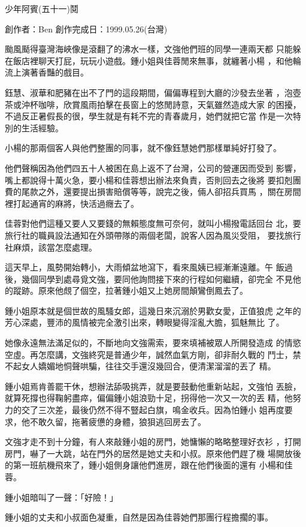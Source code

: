 



少年阿賓(五十一)鬩

創作者：Ben
創作完成日：1999.05.26(台灣)


颱風颳得臺灣海峽像是滾翻了的沸水一樣，文強他們班的同學一連兩天都
只能躲在飯店裡聊天打屁，玩玩小遊戲。鍾小姐與佳蓉閒來無事，就纏著小楊
，和他輪流上演著香豔的戲目。

鈺慧、淑華和肥豬在出不了門的這段期間，偏偏專程到大廳的沙發去坐著
，泡壺茶或沖杯咖啡，欣賞風雨拍擊在長窗上的悠閒詩意，天氣雖然造成大家
的困擾，不過反正暑假長的很，學生就是有耗不完的青春歲月，她們就把它當
作是一次特別的生活經驗。

小楊的那兩個客人與他們整團的同事，就不像鈺慧她們那樣單純好打發了。

他們聲稱因為他們四五十人被困在島上返不了台灣，公司的營運因而受到
影響，嘴上都說得十萬火急，要小楊和佳蓉想出辦法來負責，否則回去之後將
要扣剋團費的尾款之外，還要提出損害賠償等等，說完之後，倆人卻招兵買馬
，關在房間裡打起通宵的麻將，快活過癮去了。

佳蓉對他們這種又要人又要錢的無賴態度無可奈何，就叫小楊撥電話回台
北，要旅行社的職員設法通知在外頭帶隊的兩個老闆，說客人因為風災受阻，
要找旅行社麻煩，該當怎麼處理。

這天早上，風勢開始轉小，大雨傾盆地瀉下，看來風姨已經漸漸遠離。午
飯過後，幾個同學到處尋覓文強，要同他詢問接下來的行程如何繼續，卻完全
不見他的蹤跡。原來他覤了個空，拉著鍾小姐又上她房間顛鸞倒鳳去了。

鍾小姐原本就是個世故的風騷女郎，這幾日來沉溺於男歡女愛，正值狼虎
之年的芳心深處，豐沛的風情被完全激引出來，轉眼變得淫亂大膽，狐魅無比
了。

她像永遠無法滿足似的，不斷地向文強需索，要來填補被眾人所開發造成
的情慾空虛。再怎麼講，文強終究是普通少年，誠然血氣方剛，卻非耐久戰的
鬥士，禁不起女人嬌媚地恫聲哄騙，往往交手還沒幾回合，便清潔溜溜的丟了
精。

鍾小姐焉肯善罷干休，想辦法舔吸挑弄，就是要鼓動他重新站起，文強怕
丟臉，就算死撐也得鞠躬盡瘁，偏偏鍾小姐浪勁十足，拐得他一次又一次的丟
精，他努力的交了三次差，最後仍然不得不豎起白旗，鳴金收兵。因為怕鍾小
姐再度要求，他不敢久留，拖著疲憊的身體，狼狽逃回房去了。

文強才走不到十分鐘，有人來敲鍾小姐的房門，她慵懶的略略整理好衣衫
，打開房門，嚇了一大跳，站在門外的居然是她丈夫和小叔。原來他們趕了機
場開放後的第一班航機飛來了，鍾小姐側身讓他們進房，跟在他們後面的還有
小楊和佳蓉。

鍾小姐暗叫了一聲：「好險！」

鍾小姐的丈夫和小叔面色凝重，自然是因為佳蓉她們那團行程擔擱的事。

